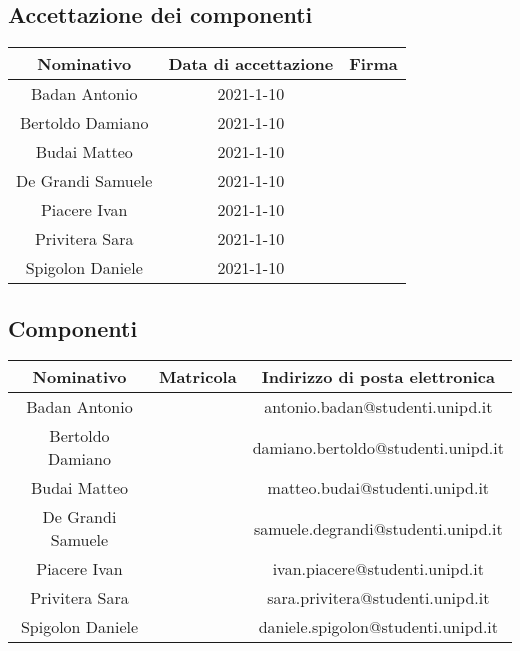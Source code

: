 \subsection{Accettazione dei componenti}
\begin{table}[H]
	\centering
	\renewcommand{\arraystretch}{1.5}
	\begin{tabular}{|c|c|c|}
		\hline
		\rowcolor{lighter-grayer}
		Nominativo & Data di accettazione & Firma \\
		\hline
		Badan Antonio & 2021-1-10 & \\
		\hline
		Bertoldo Damiano & 2021-1-10 & \\
		\hline
		Budai Matteo & 2021-1-10 &  \\
		\hline
		De Grandi Samuele & 2021-1-10 & \\
		\hline
		Piacere Ivan & 2021-1-10 & \\
		\hline
		Privitera Sara & 2021-1-10 & \\
		\hline
		Spigolon Daniele & 2021-1-10 & \\
		\hline
	\end{tabular}
\end{table}

\subsection{Componenti}
\begin{table}[H]
	\centering
	\renewcommand{\arraystretch}{1.5}
	\begin{tabular}{|c|c|c|}
		\hline
		\rowcolor{lighter-grayer}
		Nominativo & Matricola & Indirizzo di posta elettronica \\
		\hline
		Badan Antonio &  & antonio.badan@studenti.unipd.it\\
		\hline
		Bertoldo Damiano &  & damiano.bertoldo@studenti.unipd.it \\
		\hline
		Budai Matteo &  &  matteo.budai@studenti.unipd.it \\
		\hline
		De Grandi Samuele &  & samuele.degrandi@studenti.unipd.it \\
		\hline
		Piacere Ivan &  & ivan.piacere@studenti.unipd.it \\
		\hline
		Privitera Sara &  & sara.privitera@studenti.unipd.it \\
		\hline
		Spigolon Daniele &  & daniele.spigolon@studenti.unipd.it \\
		\hline
	\end{tabular}
\end{table}